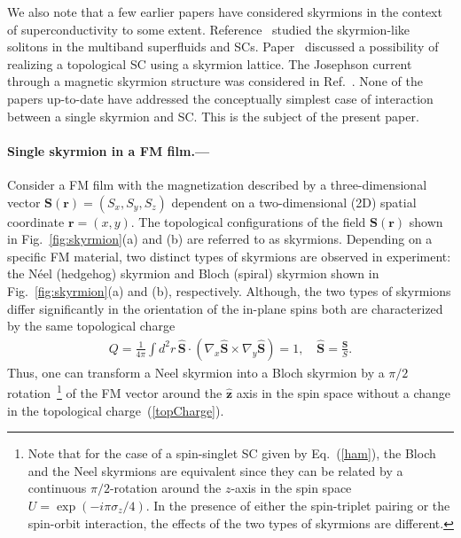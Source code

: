 \documentclass[twocolumn,showpacs,floatfix,longbibliography]{revtex4-1}
\begin{document}
We also note that a few earlier papers have considered skyrmions in the context of superconductivity to some extent. Reference~\cite{Garaud2011} studied the skyrmion-like solitons in the multiband superfluids and SCs. Paper~\cite{Nakosai2013} discussed a possibility of realizing a topological SC using a skyrmion lattice. The Josephson current through a magnetic skyrmion structure was considered in Ref.~\cite{Yokoyama2015}. None of the papers up-to-date have addressed the conceptually simplest case of interaction between a single skyrmion and SC. This is the subject of the present paper.

\paragraph*{Single skyrmion in a FM film.---} \label{sec:skyrmion}


Consider a FM film with the magnetization described by a three-dimensional vector $\bm S(\bm r) = (S_x,S_y,S_z)$ dependent on a two-dimensional (2D) spatial coordinate $\bm r = (x,y)$. The topological configurations of the field $\bm S(\bm r)$ shown in Fig.~\ref{fig:skyrmion}(a) and (b) are referred to as skyrmions.  Depending on a specific FM material, two distinct types of skyrmions are observed in experiment: the N\'eel (hedgehog) skyrmion and Bloch (spiral) skyrmion shown in Fig.~\ref{fig:skyrmion}(a) and (b), respectively. Although, the two types of skyrmions differ significantly in the orientation of the in-plane spins both are characterized by the same topological charge
\begin{align}
	Q = \frac{1}{4\pi} \int d^2r \, \hat {\bm S}\cdot (\nabla_x\hat {\bm S}\times\nabla_y\hat {\bm S})=1,\quad  \hat {\bm S}= \frac{\bm S}{S}.
	\label{topCharge}
\end{align}
Thus, one can transform a Neel skyrmion into a Bloch skyrmion by a $\pi/2$ rotation~\footnote{Note that for the case of a spin-singlet SC given by Eq.~(\ref{ham}), the Bloch and the Neel skyrmions are equivalent since they can be related by a continuous $\pi/2$-rotation around the $z$-axis in the spin space $U = \exp(-i\pi\sigma_z/4)$. In the presence of either the spin-triplet pairing or the spin-orbit interaction, the effects of the two types of skyrmions are different.} of the FM vector around the $\hat {\bm z}$ axis in the spin space without a change in the topological charge~(\ref{topCharge}).
\end{document}
